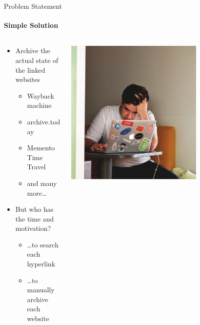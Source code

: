 \documentclass[
    ngerman,%
    authorontitle=true,
]{bfhbeamer}
\begin{document}
    \begin{frame}{Problem Statement}
        \framesubtitle{Simple Solution}
        \begin{columns} %
            \begin{column}{0.5\textwidth} %
                \begin{itemize}
                    \item Archive the actual state of the linked websites
                    \begin{itemize}
                        \item Wayback machine
                        \item archive.today
                        \item Memento Time Travel
                        \item and many more…
                    \end{itemize}
                    \item But who has the time and motivation?
                    \begin{itemize}
                        \item \ldots to search each hyperlink
                        \item \ldots to manually archive each website
                    \end{itemize}
                \end{itemize}
            \end{column}
            \begin{column}{0.4\textwidth} %
                \includegraphics[width=0.7\textwidth]{pictures/frustrated}
            \end{column}
        \end{columns}
    \end{frame}
\end{document}
